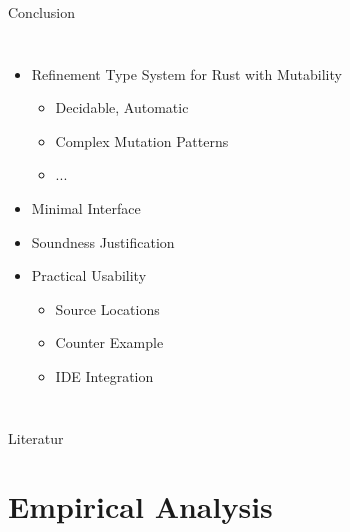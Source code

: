 \documentclass{sdqbeamer}
\begin{document}
\begin{frame}{Conclusion}
  \begin{columns}
    \begin{itemize}
      \item Refinement Type System for Rust with Mutability
      \begin{itemize}
        \item Decidable, Automatic
        \item Complex Mutation Patterns
        \item ...
      \end{itemize}
      \item Minimal Interface
      \item Soundness Justification
      \item Practical Usability
      \begin{itemize}
        \item Source Locations
        \item Counter Example
        \item IDE Integration
      \end{itemize}
    \end{itemize}

  \end{columns}
\end{frame}

\begin{frame}

\end{frame}


\appendix

\beginbackup


\begin{frame}[allowframebreaks]{Literatur}
  \tiny{
    \printbibliography
  }
\end{frame}



\section{Empirical Analysis}
\end{document}

